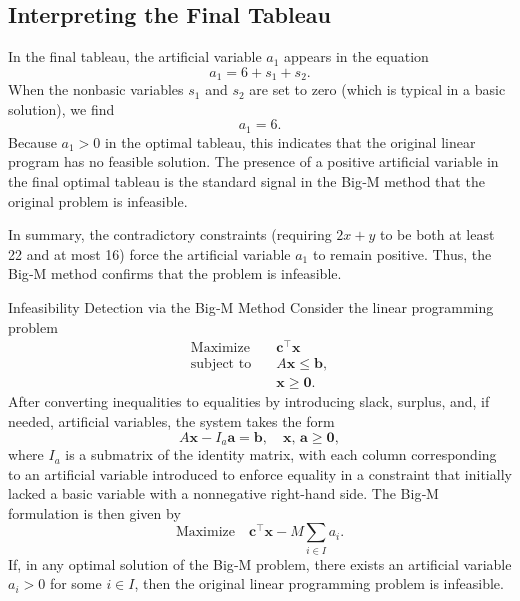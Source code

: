 \subsection*{Interpreting the Final Tableau}

In the final tableau, the artificial variable \(a_1\) appears in the equation
\[
a_1 = 6 + s_1 + s_2.
\]
When the nonbasic variables \(s_1\) and \(s_2\) are set to zero (which is typical in a basic solution), we find
\[
a_1 = 6.
\]
Because \(a_1 > 0\) in the optimal tableau, this indicates that the original linear program has no feasible solution. The presence of a positive artificial variable in the final optimal tableau is the standard signal in the Big‑M method that the original problem is infeasible.

\bigskip

\noindent In summary, the contradictory constraints (requiring \(2x+y\) to be both at least 22 and at most 16) force the artificial variable \(a_1\) to remain positive. Thus, the Big‑M method confirms that the problem is infeasible.

\begin{theorem}{Infeasibility Detection via the Big‑M Method}{}{}
Consider the linear programming problem
\[
\begin{aligned}
\text{Maximize}\quad & \mathbf{c}^\top \mathbf{x} \\
\text{subject to}\quad & A\mathbf{x} \le \mathbf{b}, \\
& \mathbf{x} \ge \mathbf{0}.
\end{aligned}
\]
After converting inequalities to equalities by introducing slack, surplus, and, if needed, artificial variables, the system takes the form
\[
A\mathbf{x} - I_a \mathbf{a} = \mathbf{b},\quad \mathbf{x},\, \mathbf{a} \ge \mathbf{0},
\]
where \( I_a \) is a submatrix of the identity matrix, with each column corresponding to an artificial variable introduced to enforce equality in a constraint that initially lacked a basic variable with a nonnegative right-hand side. The Big‑M formulation is then given by
\[
\text{Maximize}\quad \mathbf{c}^\top \mathbf{x} - M\sum_{i\in I} a_i.
\]
If, in any optimal solution of the Big‑M problem, there exists an artificial variable \(a_i > 0\) for some \(i\in I\), then the original linear programming problem is infeasible.
\end{theorem}

